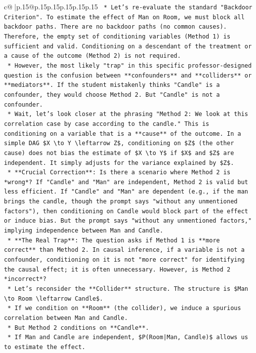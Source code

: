 \documentclass{article}
\begin{document}
{\begin{supertabular}{c@{$\;$}|p{.15\linewidth}@{}p{.15\linewidth}p{.15\linewidth}p{.15\linewidth}p{.15\linewidth}p{.15\linewidth}}
{{{\texttt{    *   Let's re{-}evaluate the standard "Backdoor Criterion". To estimate the effect of Man on Room, we must block all backdoor paths. There are no backdoor paths (no common causes). Therefore, the empty set of conditioning variables (Method 1) is sufficient and valid. Conditioning on a descendant of the treatment or a cause of the outcome (Method 2) is not required.} \\
\texttt{    *   However, the most likely "trap" in this specific professor{-}designed question is the confusion between **confounders** and **colliders** or **mediators**. If the student mistakenly thinks "Candle" is a confounder, they would choose Method 2. But "Candle" is not a confounder.} \\
\texttt{    *   Wait, let's look closer at the phrasing "Method 2: We look at this correlation case by case according to the candle." This is conditioning on a variable that is a **cause** of the outcome. In a simple DAG \$X \textbackslash{}to Y \textbackslash{}leftarrow Z\$, conditioning on \$Z\$ (the other cause) does not bias the estimate of \$X \textbackslash{}to Y\$ if \$X\$ and \$Z\$ are independent. It simply adjusts for the variance explained by \$Z\$.} \\
\texttt{    *   **Crucial Correction**: Is there a scenario where Method 2 is *wrong*? If "Candle" and "Man" are independent, Method 2 is valid but less efficient. If "Candle" and "Man" are dependent (e.g., if the man brings the candle, though the prompt says "without any unmentioned factors"), then conditioning on Candle would block part of the effect or induce bias. But the prompt says "without any unmentioned factors," implying independence between Man and Candle.} \\
\texttt{    *   **The Real Trap**: The question asks if Method 1 is **more correct** than Method 2. In causal inference, if a variable is not a confounder, conditioning on it is not "more correct" for identifying the causal effect; it is often unnecessary. However, is Method 2 *incorrect*?} \\
\texttt{    *   Let's reconsider the **Collider** structure. The structure is \$Man \textbackslash{}to Room \textbackslash{}leftarrow Candle\$.} \\
\texttt{    *   If we condition on **Room** (the collider), we induce a spurious correlation between Man and Candle.} \\
\texttt{    *   But Method 2 conditions on **Candle**.} \\
\texttt{    *   If Man and Candle are independent, \$P(Room|Man, Candle)\$ allows us to estimate the effect.} \\
}}}
\end{supertabular}}
\end{document}

